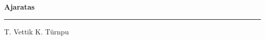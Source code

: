 \documentclass[10pt]{book}
\begin{document}
{
  \samepage
  \raggedbottom
  \raggedright
  \sloppy


  \vspace{0.2in}

  \noindent\begin{minipage}{.1\textwidth}
    \hfill\vspace{0.1in}
  \end{minipage}%
  \noindent\begin{minipage}{.8\textwidth}
    \centering
    \bfseries
    \large Ajaratas
  \end{minipage}%
  \noindent\begin{minipage}{.1\textwidth}
      \hfill\vspace{0.1in}
  \end{minipage}

  \nopagebreak[4]
  \vspace{0.1in}
  \nopagebreak[4]
  \hrule height 0.05ex
  \nopagebreak[4]
  \vspace{-0.05in}

  {\footnotesize T. Vettik \hfill K. T\"urnpu }\\
  \vspace{0.01in}



}
\end{document}
